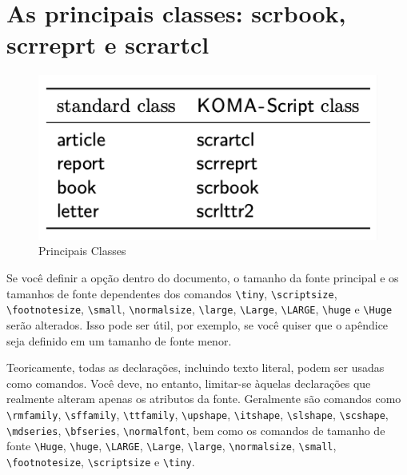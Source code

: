 \chapter[As principais classes]{As principais classes: scrbook, scrreprt e scrartcl}
\begin{figure}[h]
    \centering
    \includegraphics[width=0.60\linewidth]{classes.png}
    \caption{Principais Classes}
    \label{fig:class}
\end{figure}

Se você definir a opção dentro do documento, o tamanho da fonte principal e os tamanhos de fonte dependentes dos comandos \verb|\tiny|, \verb|\scriptsize|, \verb|\footnotesize|, \verb|\small|, \verb|\normalsize|, \verb|\large|, \verb|\Large|, \verb|\LARGE|, \verb|\huge| e \verb|\Huge| serão alterados. Isso pode ser útil, por exemplo, se você quiser que o apêndice seja definido em um tamanho de fonte menor.

Teoricamente, todas as declarações, incluindo texto literal, podem ser usadas como comandos. Você deve, no entanto, limitar-se àquelas declarações que realmente alteram apenas os atributos da fonte. Geralmente são comandos como \verb|\rmfamily|, \verb|\sffamily|, \verb|\ttfamily|, \verb|\upshape|, \verb|\itshape|, \verb|\slshape|, \verb|\scshape|, \verb|\mdseries|, \verb|\bfseries|, \verb|\normalfont|, bem como os comandos de tamanho de fonte \verb|\Huge|, \verb|\huge|, \verb|\LARGE|, \verb|\Large|, \verb|\large|, \verb|\normalsize|, \verb|\small|, \verb|\footnotesize|, \verb|\scriptsize| e \verb|\tiny|.

